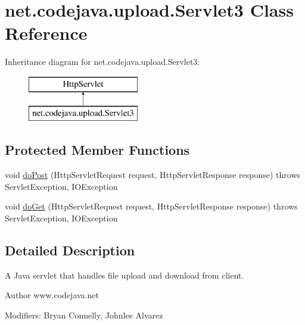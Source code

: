 \hypertarget{classnet_1_1codejava_1_1upload_1_1_servlet3}{\section{net.\+codejava.\+upload.\+Servlet3 Class Reference}
\label{classnet_1_1codejava_1_1upload_1_1_servlet3}
}
Inheritance diagram for net.\+codejava.\+upload.\+Servlet3\+:\begin{figure}[H]
\begin{center}
\leavevmode
\includegraphics[height=2.000000cm]{classnet_1_1codejava_1_1upload_1_1_servlet3}
\end{center}
\end{figure}
\subsection*{Protected Member Functions}
\begin{DoxyCompactItemize}
\item 
void \hyperlink{classnet_1_1codejava_1_1upload_1_1_servlet3_a3148241befd6dd44828ded219d296ccb}{do\+Post} (Http\+Servlet\+Request request, Http\+Servlet\+Response response)  throws Servlet\+Exception, I\+O\+Exception 
\item 
void \hyperlink{classnet_1_1codejava_1_1upload_1_1_servlet3_a98ca5751af75437924fa30f9ac802702}{do\+Get} (Http\+Servlet\+Request request, Http\+Servlet\+Response response)  throws Servlet\+Exception, I\+O\+Exception 
\end{DoxyCompactItemize}


\subsection{Detailed Description}
A Java servlet that handles file upload and download from client. \begin{DoxyAuthor}{Author}
www.\+codejava.\+net 

 Modifiers\+: Bryan Connelly, Johnlee Alvarez 

 
\end{DoxyAuthor}


